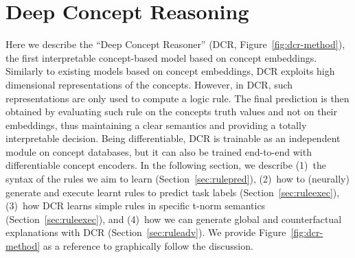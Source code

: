 \section{Deep Concept Reasoning}
\label{sec:dcr-method}
Here we describe the ``Deep Concept Reasoner'' (DCR, Figure~\ref{fig:dcr-method}), the first interpretable concept-based model based on concept embeddings.  Similarly to existing models based on concept embeddings, DCR exploits high dimensional representations of the concepts. However, in DCR, such representations are only used to compute a logic rule. The final prediction is then obtained by evaluating such rule on the concepts truth values and not on their embeddings, thus maintaining a clear semantics and providing a totally interpretable decision. 
Being differentiable, DCR is trainable as an independent module on concept databases, but it can also be trained end-to-end with differentiable concept encoders.
In the following section, we describe \mbox{(1) the} syntax of the rules we aim to learn (Section~\ref{sec:rulepred}), \mbox{(2) how} to (neurally) generate and execute learnt rules to predict task labels (Section~\ref{sec:ruleexec}), (\mbox{3) how} DCR learns simple rules in specific t-norm semantics (Section~\ref{sec:ruleexec}), and \mbox{(4) how} we can generate global and counterfactual explanations with DCR (Section~\ref{sec:ruleadv}). We provide Figure~\ref{fig:dcr-method} as a reference to graphically follow the discussion.


